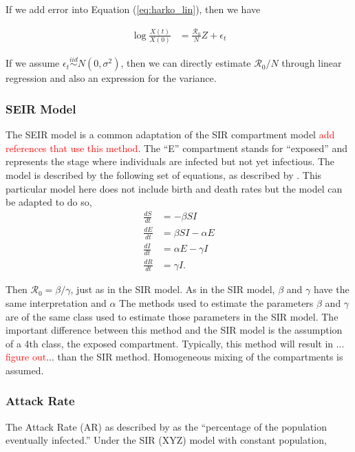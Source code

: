 \documentclass[12pt]{article}
\newcommand{\com}[1]{\textcolor{red}{ #1}}
\newcommand{\rr}{\ensuremath{\mathcal{R}_0}}
\begin{document}
If we add error into Equation (\ref{eq:harko_lin}), then we have

\begin{align}
  \log \frac{X(t)}{X(0)} &=  \frac{\rr}{N} Z  + \epsilon_t\label{eq:r0_harko}
\end{align}

If we assume $\epsilon_t \overset{iid}{\sim}N(0, \sigma^2)$, then we can directly estimate $\rr/N$ through linear regression and also an expression for the variance.


\subsubsection{SEIR Model}
\label{sec:seir-model}

The SEIR model is a common adaptation of the SIR compartment model \com{add references that use this method}.  The ``E'' compartment stands for ``exposed'' and represents the stage where individuals are infected but not yet infectious.  The model is described by the following set of equations, as described by \cite{cintronarias2009}.  This particular model here does not include birth and death rates but the model can be adapted to do so,
\begin{align*}
  \frac{dS}{dt} &= - \beta SI \\
  \frac{dE}{dt} &= \beta SI  - \alpha E\\
  \frac{dI}{dt} &= \alpha E - \gamma I \\
  \frac{dR}{dt} &= \gamma I.
\end{align*}

Then $\rr = \beta / \gamma$, just as in the SIR model.  As in the SIR model, $\beta$ and $\gamma$ have the same interpretation and $\alpha$  The methods used to estimate the parameters $\beta$ and $\gamma$ are of the same class used to estimate those parameters in the SIR model.  The important difference between this method and the SIR model is the assumption of a 4th class, the exposed compartment.  Typically, this method will result in ...\com{figure out}... than the SIR method.  Homogeneous mixing of the compartments is assumed.



\subsubsection{Attack Rate}

The Attack Rate (AR) as described by \cite{obadia2012r0} as the ``percentage of the population eventually infected.''  Under the SIR (XYZ) model with constant population,
\end{document}
